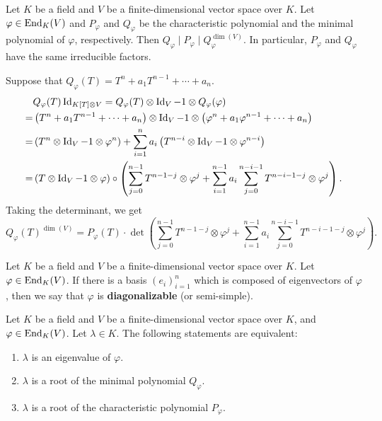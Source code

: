 \begin{propositionenv}
    Let $K$ be a field and $V$ be a finite-dimensional vector space over $K$.
    Let $\varphi \in \operatorname{\mathrm{End}}_{K}(V)$ and $P_{\varphi}$ and $Q_{\varphi}$ be the characteristic polynomial and the minimal polynomial of $\varphi$, respectively.
    Then $Q_{\varphi} \mid P_{\varphi} \mid Q_{\varphi}^{\dim(V)}$.
    In particular, $P_{\varphi}$ and $Q_{\varphi}$ have the same irreducible factors.
\end{propositionenv}
\begin{proofenv}
    Suppose that $Q_{\varphi}(T) = T^n + a_1 T^{n-1} + \cdots + a_n$.
    $$\begin{aligned}
        & Q_{\varphi}(T) \operatorname{\mathrm{Id}}_{K[T]\otimes V} = Q_{\varphi}(T) \otimes \operatorname{\mathrm{Id}}_{V} - 1 \otimes Q_{\varphi}(\varphi)\\
        = & \left(T^n + a_1 T^{n-1} + \cdots + a_n\right) \otimes \operatorname{\mathrm{Id}}_{V} - 1 \otimes \left(\varphi^n + a_1 \varphi^{n-1} + \cdots + a_n\right)\\
        = & \left(T^n \otimes \operatorname{\mathrm{Id}}_{V} - 1 \otimes \varphi^n\right) + \sum_{i=1}^{n}a_i \left(T^{n-i}\otimes\operatorname{\mathrm{Id}}_{V} - 1 \otimes \varphi^{n-i}\right)\\
        = & \left(T \otimes \operatorname{\mathrm{Id}}_{V} - 1 \otimes \varphi\right) \circ \left(\sum_{j=0}^{n-1} T^{n-1-j}\otimes \varphi^j + \sum_{i=1}^{n-1}a_i \sum_{j=0}^{n-i-1} T^{n-i-1-j} \otimes \varphi^j\right).
    \end{aligned}$$
    Taking the determinant, we get
    $$Q_{\varphi}(T)^{\dim(V)} = P_\varphi(T) \cdot \det\left(\sum_{j=0}^{n-1} T^{n-1-j}\otimes \varphi^j + \sum_{i=1}^{n-1}a_i \sum_{j=0}^{n-i-1} T^{n-i-1-j} \otimes \varphi^j\right).$$
\end{proofenv}

\begin{definitionenv}
    Let $K$ be a field and $V$ be a finite-dimensional vector space over $K$.
    Let $\varphi \in \operatorname{\mathrm{End}}_{K}(V)$.
    If there is a basis $(e_i)_{i=1}^n$ which is composed of eigenvectors of $\varphi$, then we say that $\varphi$ is
    \textbf{diagonalizable} (or semi-simple).
\end{definitionenv}

\begin{propositionenv}
    Let $K$ be a field and $V$ be a finite-dimensional vector space over $K$,
    and $\varphi \in \operatorname{\mathrm{End}}_{K}(V)$.
    Let $\lambda \in K$.
    The following statements are equivalent:
    \begin{enumerate}[label = (\arabic*)]
        \item $\lambda$ is an eigenvalue of $\varphi$.
        \item $\lambda$ is a root of the minimal polynomial $Q_{\varphi}$.
        \item $\lambda$ is a root of the characteristic polynomial $P_{\varphi}$.
    \end{enumerate}
\end{propositionenv}

